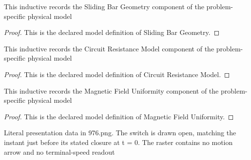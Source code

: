 \begin{definition}
  \label{def:physics:phyx-mini-0976:phyxminiproblems-problemphyxmini0976-slidingbargeometry}
  This inductive records the Sliding Bar Geometry component of the problem-specific physical model
\end{definition}
\begin{proof}
  This is the declared model definition of Sliding Bar Geometry.
\end{proof}
\begin{definition}
  \label{def:physics:phyx-mini-0976:phyxminiproblems-problemphyxmini0976-circuitresistancemodel}
  This inductive records the Circuit Resistance Model component of the problem-specific physical model
\end{definition}
\begin{proof}
  This is the declared model definition of Circuit Resistance Model.
\end{proof}
\begin{definition}
  \label{def:physics:phyx-mini-0976:phyxminiproblems-problemphyxmini0976-magneticfielduniformity}
  This inductive records the Magnetic Field Uniformity component of the problem-specific physical model
\end{definition}
\begin{proof}
  This is the declared model definition of Magnetic Field Uniformity.
\end{proof}
\begin{definition}
  \label{def:physics:phyx-mini-0976:phyxminiproblems-problemphyxmini0976-slidingbarrailfigure}
  Literal presentation data in 976.png. The switch is drawn open, matching the instant just before its stated closure at t = 0. The raster contains no motion arrow and no terminal-speed readout
\end{definition}

